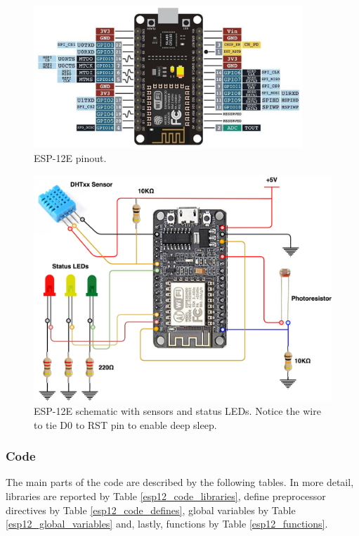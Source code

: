 \begin{figure}[H]
	\begin{center}
		\includegraphics[width=0.9\textwidth]{./pictures/ESP-12E_pinout.JPG}
		\caption{ESP-12E pinout.}
		\label{esp12_pinout}
	\end{center}
\end{figure}

\begin{figure}[H]
	\begin{center}
		\includegraphics[width=\textwidth]{./pictures/ESP-12E_wiring.png}
		\caption{ESP-12E schematic with sensors and status LEDs. Notice the wire to tie D0 to RST pin to enable deep sleep.}
		\label{esp12_wiring}
	\end{center}
\end{figure}

\subsubsection{Code}
The main parts of the code are described by the following tables. In more detail, libraries are reported by Table \ref{esp12_code_libraries}, define preprocessor directives by Table \ref{esp12_code_defines}, global variables by Table \ref{esp12_global_variables} and, lastly, functions by Table \ref{esp12_functions}.

